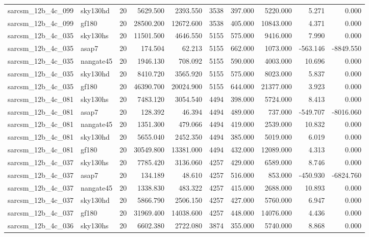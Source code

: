 \begin{longtable}{llrrrrrrrr}
sarcsm\_12b\_4c\_099 & sky130hd & 20 & 5629.500 & 2393.550 & 3538 & 397.000 & 5220.000 & 5.271 & 0.000 \\
sarcsm\_12b\_4c\_099 & gf180 & 20 & 28500.200 & 12672.600 & 3538 & 405.000 & 10843.000 & 4.371 & 0.000 \\
sarcsm\_12b\_4c\_035 & sky130hs & 20 & 11501.500 & 4646.550 & 5155 & 575.000 & 9416.000 & 7.990 & 0.000 \\
sarcsm\_12b\_4c\_035 & asap7 & 20 & 174.504 & 62.213 & 5155 & 662.000 & 1073.000 & -563.146 & -8849.550 \\
sarcsm\_12b\_4c\_035 & nangate45 & 20 & 1946.130 & 708.092 & 5155 & 590.000 & 4003.000 & 10.696 & 0.000 \\
sarcsm\_12b\_4c\_035 & sky130hd & 20 & 8410.720 & 3565.920 & 5155 & 575.000 & 8023.000 & 5.837 & 0.000 \\
sarcsm\_12b\_4c\_035 & gf180 & 20 & 46390.700 & 20024.900 & 5155 & 644.000 & 21377.000 & 3.923 & 0.000 \\
sarcsm\_12b\_4c\_081 & sky130hs & 20 & 7483.120 & 3054.540 & 4494 & 398.000 & 5724.000 & 8.413 & 0.000 \\
sarcsm\_12b\_4c\_081 & asap7 & 20 & 128.392 & 46.394 & 4494 & 489.000 & 737.000 & -549.707 & -8016.060 \\
sarcsm\_12b\_4c\_081 & nangate45 & 20 & 1351.300 & 479.066 & 4494 & 419.000 & 2539.000 & 10.832 & 0.000 \\
sarcsm\_12b\_4c\_081 & sky130hd & 20 & 5655.040 & 2452.350 & 4494 & 385.000 & 5019.000 & 6.019 & 0.000 \\
sarcsm\_12b\_4c\_081 & gf180 & 20 & 30549.800 & 13381.000 & 4494 & 432.000 & 12089.000 & 4.313 & 0.000 \\
sarcsm\_12b\_4c\_037 & sky130hs & 20 & 7785.420 & 3136.060 & 4257 & 429.000 & 6589.000 & 8.746 & 0.000 \\
sarcsm\_12b\_4c\_037 & asap7 & 20 & 134.189 & 48.610 & 4257 & 516.000 & 853.000 & -450.930 & -6824.760 \\
sarcsm\_12b\_4c\_037 & nangate45 & 20 & 1338.830 & 483.322 & 4257 & 415.000 & 2688.000 & 10.893 & 0.000 \\
sarcsm\_12b\_4c\_037 & sky130hd & 20 & 5866.790 & 2506.150 & 4257 & 427.000 & 5760.000 & 6.947 & 0.000 \\
sarcsm\_12b\_4c\_037 & gf180 & 20 & 31969.400 & 14038.600 & 4257 & 448.000 & 14076.000 & 4.436 & 0.000 \\
sarcsm\_12b\_4c\_036 & sky130hs & 20 & 6602.380 & 2722.080 & 3874 & 355.000 & 5740.000 & 8.868 & 0.000 \\

\end{longtable}
